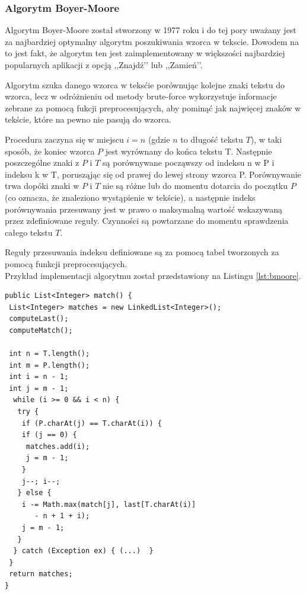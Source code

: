 \documentclass[a4paper,12pt]{article}
\begin{document}
\newpage

\subsubsection{Algorytm Boyer-Moore}

Algorytm Boyer-Moore został stworzony w 1977 roku i do tej pory uważany jest za najbardziej optymalny algorytm poszukiwania wzorca w tekscie. Dowodem na to jest fakt, że algorytm ten jest zaimplementowany w większości najbardziej popularnych aplikacji z opcją ,,Znajdź’’ lub ,,Zamień’’.

Algorytm szuka danego wzorca w teksćie porównując kolejne znaki tekstu do wzorca, lecz w odróżnieniu od metody brute-force wykorzystuje informacje zebrane za pomocą fukcji preprocesujących, aby pominąć jak najwięcej znaków w tekście, które na pewno nie pasują do wzorca.

Procedura zaczyna się w miejscu $i = n$ (gdzie $n$ to długość tekstu $T$), w taki sposób, że koniec wzorca $P$ jest wyrównany do końca tekstu T. Następnie poszczególne znaki z $P$ i $T$ są porównywane począwszy od indeksu n w P i indeksu k w T, porusząjąc się od prawej do lewej strony wzorca P. Porównywanie trwa dopóki znaki w $P$ i $T$ nie są różne lub do momentu dotarcia do początku $P$ (co oznacza, że znaleziono wystąpienie w tekście), a następnie indeks porównywania przesuwany jest w prawo o maksymalną wartość wskazywaną przez zdefiniowane reguły. Czynności są powtarzane do momentu sprawdzenia całego tekstu $T$.

Reguły przesuwania indeksu definiowane są za pomocą tabel tworzonych za pomocą funkcji preprocesujących.
\\
Przykład implementacji algorytmu został przedstawiony na Listingu \ref{lst:bmoore}.
\\
\begin{lstlisting}[caption={Przykładowa implementacja algorytmu Boyer-Moore wyszukująca wzorzec $P$ w tekście $T$.}, label={lst:bmoore}]
public List<Integer> match() {
 List<Integer> matches = new LinkedList<Integer>();
 computeLast();
 computeMatch();

 int n = T.length();
 int m = P.length();
 int i = n - 1;
 int j = m - 1;
  while (i >= 0 && i < n) {
   try {
    if (P.charAt(j) == T.charAt(i)) {
	if (j == 0) {
	 matches.add(i);
	 j = m - 1;
    }
	j--; i--;
   } else {
    i -= Math.max(match[j], last[T.charAt(i)] 
       - n + 1 + i);
    j = m - 1;
   }
  } catch (Exception ex) { (...)  }
 }
 return matches;
}
\end{lstlisting}
\end{document}

